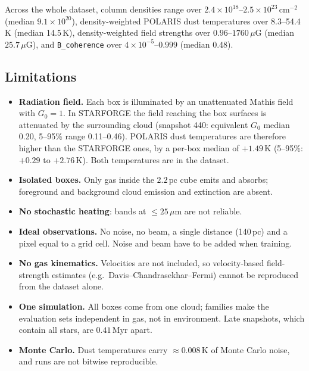 Across the whole dataset, column densities range over $2.4\times10^{18}$--$2.5\times10^{23}\,\mathrm{cm^{-2}}$
(median $9.1\times10^{20}$), density-weighted POLARIS dust temperatures over 8.3--54.4\,K (median 14.5\,K),
density-weighted field strengths over $0.96$--$1760\,\mu\mathrm{G}$ (median $25.7\,\mu\mathrm{G}$), and
\texttt{B\_coherence} over $4\times10^{-5}$--$0.999$ (median 0.48).

\subsection{Limitations}
\label{sec:dataset:limitations}

\begin{itemize}
  \item \textbf{Radiation field.} Each box is illuminated by an unattenuated Mathis field with $G_0=1$. In
  STARFORGE the field reaching the box surfaces is attenuated by the surrounding cloud (snapshot 440: equivalent
  $G_0$ median 0.20, 5--95\% range 0.11--0.46). POLARIS dust temperatures are therefore higher than the STARFORGE
  ones, by a per-box median of $+1.49\,\mathrm{K}$ (5--95\%: $+0.29$ to $+2.76\,\mathrm{K}$). Both temperatures
  are in the dataset.
  \item \textbf{Isolated boxes.} Only gas inside the $2.2\,\mathrm{pc}$ cube emits and absorbs; foreground and
  background cloud emission and extinction are absent.
  \item \textbf{No stochastic heating}: bands at $\le25\,\mu\mathrm{m}$ are not reliable.
  \item \textbf{Ideal observations.} No noise, no beam, a single distance (140\,pc) and a pixel equal to a grid
  cell. Noise and beam have to be added when training.
  \item \textbf{No gas kinematics.} Velocities are not included, so velocity-based field-strength estimates
  (e.g.\ Davis--Chandrasekhar--Fermi) cannot be reproduced from the dataset alone.
  \item \textbf{One simulation.} All boxes come from one cloud; families make the evaluation sets independent in
  gas, not in environment. Late snapshots, which contain all stars, are $0.41\,\mathrm{Myr}$ apart.
  \item \textbf{Monte Carlo.} Dust temperatures carry $\approx0.008\,\mathrm{K}$ of Monte Carlo noise, and runs
  are not bitwise reproducible.
\end{itemize}

